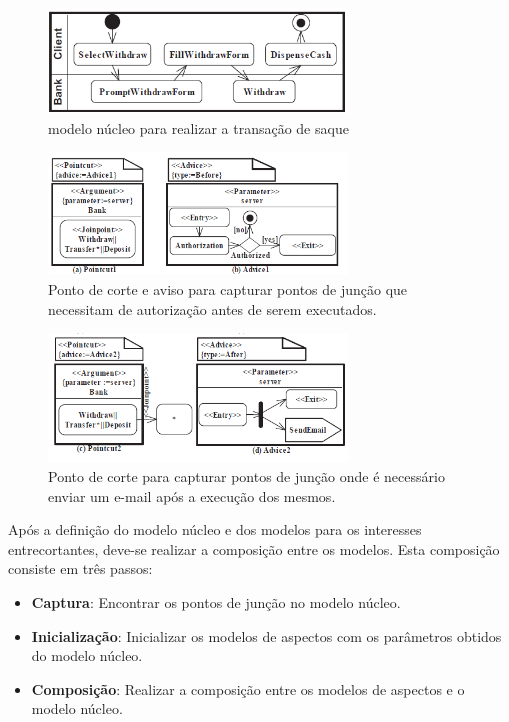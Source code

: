 \begin{figure}
	\centering
	\includegraphics[width=300px]{img/withdraw_base.png}
	\caption{modelo núcleo para realizar a transação de
	saque}\label{fig:withdraw_base}
\end{figure}

\begin{figure}
	\centering
	\includegraphics[width=300px]{img/withdraw_1.png}
	\caption{Ponto de corte e aviso para capturar pontos
	de junção que necessitam de autorização antes de
	serem executados.}\label{fig:withdraw_1}
\end{figure}

\begin{figure}
	\centering
	\includegraphics[width=300px]{img/withdraw_2.png}
	\caption{Ponto de corte para capturar pontos de junção onde é necessário
	enviar um e-mail após a execução dos mesmos.}\label{fig:withdraw_2}
\end{figure}

Após a definição do modelo núcleo e dos modelos para os interesses entrecortantes, deve-se realizar a composição entre os modelos. Esta composição
consiste em três passos:

\begin{itemize}
  \item \textbf{Captura}: Encontrar os pontos de junção no modelo núcleo.
  \item \textbf{Inicialização}: Inicializar os modelos de aspectos com os parâmetros obtidos do modelo núcleo.
  \item \textbf{Composição}: Realizar a composição entre os modelos de aspectos e o modelo núcleo.
\end{itemize}

